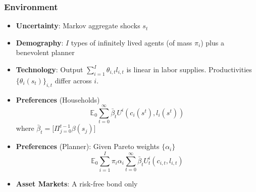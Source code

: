 \documentclass{beamer}
\begin{document}
\begin{frame}
 \frametitle{Environment}
 \begin{itemize}
 \item \textbf{Uncertainty}: Markov aggregate shocks $s_t$
  \item \textbf{Demography}: $I$ types of infinitely lived agents (of mass $\pi_i$)  plus a benevolent planner
  \item \textbf{Technology}: Output $\sum_{i=1}^I \theta_{i,t} l_{i,t}$ is linear in labor supplies. Productivities $\{\theta_i(s_t)\}_{i,t}$ differ across $i$.
  \item \textbf{Preferences }(Households)
  \begin{equation*}
\mathbb{E}_{0}\sum_{t=0}^{\infty } \bar{\beta}_t  U^{i}\left(
c_{i}(s^t),l_{i}(s^t)\right)  \label{utility lifetime}
\end{equation*}%
where 
$\bar{\beta}_t=\bigl[\Pi_{j=0}^{t-1} \beta(s_j) \bigr]$ %
\item \textbf{Preferences} (Planner): Given Pareto weights $\{\alpha_i\}$
\begin{equation*}
\mathbb{E}_{0}\sum_{i=1}^{I}\pi _{i}\alpha _{i}\sum_{t=0}^{\infty }\bar{\beta}_t U_{t}^{i}\left( c_{i,t},l_{i,t}\right)  \label{govmt objective}
\end{equation*}
  \item \textbf{Asset Markets}: A risk-free bond only
  \end{itemize}

\end{frame}
\end{document}
